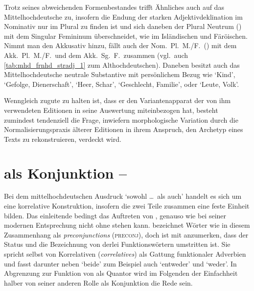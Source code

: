 Trotz seines abweichenden Formenbestandes trifft Ähnliches auch auf das
Mittelhochdeutsche zu, insofern die Endung  der starken
Adjektivdeklination im Nominativ nur im Plural zu finden ist und sich daneben
der Plural Neutrum () mit dem Singular Femininum überschneidet, wie
im Isländischen und Färöischen. Nimmt man den Akkusativ hinzu, fällt auch der
Nom.~Pl.~M./F.\ () mit dem Akk.~Pl.~M./F.\ und dem Akk.~Sg.~F.\
zusammen (vgl.~auch \cref{tab:mhd_frnhd_stradj_1} zum Althochdeutschen).
Daneben besitzt auch das Mittelhochdeutsche neutrale Substantive mit
persönlichem Bezug wie
 `Kind',
 `Gefolge, Dienerschaft',
 `Heer, Schar', %
 `Geschlecht, Familie', %
oder  `Leute, Volk'. %

Wenngleich \citet{askedal1973} zugute zu halten ist, dass er den
Variantenapparat der von ihm verwendeten Editionen in seine Auswertung
miteinbezogen hat, besteht zumindest tendenziell die Frage, inwiefern
morphologische Variation durch die Normalisierungs\-praxis älterer Editionen in
ihrem Anspruch, den Archetyp eines Texts zu rekonstruieren, verdeckt wird.


\section%
	{ als Konjunktion -- }
\label{sec:ovwbeideconj}

Bei dem mittelhochdeutschen Ausdruck  `sowohl
\dots\ als auch' handelt es sich um eine korrelative Konstruktion, insofern
die zwei Teile zusammen eine feste Einheit bilden. Das einleitende 
bedingt das Auftreten von \norm{unde}, genauso wie bei seiner modernen
Entsprechung \fw{sowohl} nicht ohne \fw{als auch} stehen kann.
\citet[367]{dalrymple2001} bezeichnet Wörter wie  in diesem
Zusammenhang als \textit{preconjunctions} (\textsc{preconj}), doch ist mit
\citet[419]{johannessen2005} anzumerken, dass der Status und die Bezeichnung
von derlei Funktionswörtern umstritten ist. Sie spricht selbst von Korrelativen
(\textit{correlatives}) als Gattung funktionaler Adverbien und fasst darunter
neben \norm{both} `beide' zum Beispiel auch \norm{either} `entweder'
und \norm{neither} `weder'. In Abgrenzung zur Funktion von 
als Quantor wird im Folgenden der Einfachheit halber von seiner anderen Rolle
als Konjunktion die Rede sein.

